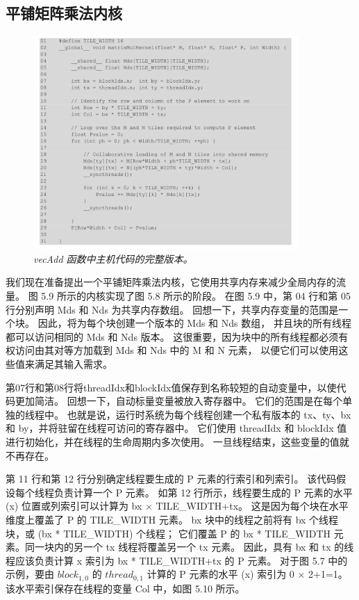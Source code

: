 \subsection{平铺矩阵乘法内核}
\begin{figure}[H]
	\centering
	\includegraphics[width=0.9\textwidth]{figs/F5.9.png}
	\caption{\textit{\color{red} vecAdd 函数中主机代码的完整版本。}}
\end{figure}

我们现在准备提出一个平铺矩阵乘法内核，它使用共享内存来减少全局内存的流量。 
图 5.9 所示的内核实现了图 5.8 所示的阶段。 在图 5.9 中，第 04 行和第 05 行分别声明 Mds 和 Nds 为共享内存数组。 
回想一下，共享内存变量的范围是一个块。 因此，将为每个块创建一个版本的 Mds 和 Nds 数组，
并且块的所有线程都可以访问相同的 Mds 和 Nds 版本。 
这很重要，因为块中的所有线程都必须有权访问由其对等方加载到 Mds 和 Nds 中的 M 和 N 元素，
以便它们可以使用这些值来满足其输入需求。

第07行和第08行将threadIdx和blockIdx值保存到名称较短的自动变量中，以使代码更加简洁。 
回想一下，自动标量变量被放入寄存器中。 它们的范围是在每个单独的线程中。 
也就是说，运行时系统为每个线程创建一个私有版本的 tx、ty、bx 和 by，并将驻留在线程可访问的寄存器中。 
它们使用 threadIdx 和 blockIdx 值进行初始化，并在线程的生命周期内多次使用。 一旦线程结束，这些变量的值就不再存在。

第 11 行和第 12 行分别确定线程要生成的 P 元素的行索引和列索引。 该代码假设每个线程负责计算一个 P 元素。 
如第 12 行所示，线程要生成的 P 元素的水平 (x) 位置或列索引可以计算为 bx × TILE\_WIDTH+tx。 
这是因为每个块在水平维度上覆盖了 P 的 TILE\_WIDTH 元素。 
bx 块中的线程之前将有 bx 个线程块，或 (bx * TILE\_WIDTH) 个线程； 
它们覆盖 P 的 bx * TILE\_WIDTH 元素。同一块内的另一个 tx 线程将覆盖另一个 tx 元素。 
因此，具有 bx 和 tx 的线程应该负责计算 x 索引为 bx * TILE\_WIDTH+tx 的 P 元素。 
对于图 5.7 中的示例，要由 $block_{1,0}$ 的 $thread_{0,1}$ 计算的 P 元素的水平 (x) 索引为 0 × 2+1=1。 
该水平索引保存在线程的变量 Col 中，如图 5.10 所示。


